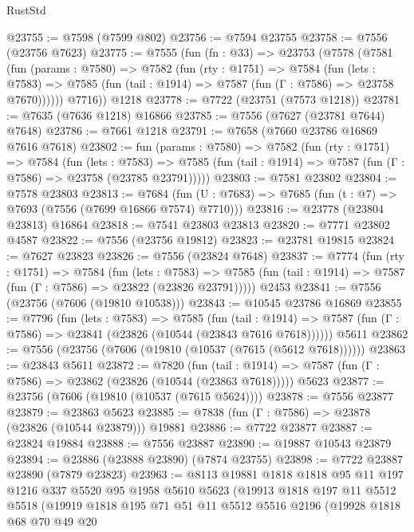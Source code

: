 \begin{lexlean}{RustStd}
\begin{coremodule}
{\begin{coremodule}
{{{{{{{{{{{{{{{{{{{{{{{{{{{{{{{{{{{{{{{{{{{@23755 := @7598 (@7599 @802)
@23756 := @7594 @23755
@23758 := @7556 (@23756 @7623)
@23775 := @7555
    (fun (fn : @33) =>
    @23753
      (@7578
        (@7581
          (fun (params : @7580) =>
          @7582
            (fun (rty : @1751) =>
            @7584
              (fun (lets : @7583) =>
              @7585 (fun (tail : @1914) => @7587 (fun (Γ : @7586) => @23758 @7670))))))
        @7716))
    @1218
@23778 := @7722 (@23751 (@7573 @1218))
@23781 := @7635 (@7636 @1218) @16866
@23785 := @7556 (@7627 (@23781 @7644) @7648)
@23786 := @7661 @1218
@23791 := @7658 (@7660 @23786 @16869 @7616 @7618)
@23802 := fun (params : @7580) =>
  @7582
    (fun (rty : @1751) =>
    @7584
      (fun (lets : @7583) =>
      @7585 (fun (tail : @1914) => @7587 (fun (Γ : @7586) => @23758 (@23785 @23791)))))
@23803 := @7581 @23802
@23804 := @7578 @23803
@23813 := @7684
    (fun (U : @7683) => @7685 (fun (t : @7) => @7693 (@7556 (@7699 @16866 @7574) @7710)))
@23816 := @23778 (@23804 @23813) @16864
@23818 := @7541 @23803 @23813
@23820 := @7771 @23802 @4587
@23822 := @7556 (@23756 @19812)
@23823 := @23781 @19815
@23824 := @7627 @23823
@23826 := @7556 (@23824 @7648)
@23837 := @7774
    (fun (rty : @1751) =>
    @7584
      (fun (lets : @7583) =>
      @7585 (fun (tail : @1914) => @7587 (fun (Γ : @7586) => @23822 (@23826 @23791)))))
    @2453
@23841 := @7556 (@23756 (@7606 (@19810 @10538)))
@23843 := @10545 @23786 @16869
@23855 := @7796
    (fun (lets : @7583) =>
    @7585
      (fun (tail : @1914) =>
      @7587 (fun (Γ : @7586) => @23841 (@23826 (@10544 (@23843 @7616 @7618))))))
    @5611
@23862 := @7556 (@23756 (@7606 (@19810 (@10537 (@7615 (@5612 @7618))))))
@23863 := @23843 @5611
@23872 := @7820
    (fun (tail : @1914) => @7587 (fun (Γ : @7586) => @23862 (@23826 (@10544 (@23863 @7618)))))
    @5623
@23877 := @23756 (@7606 (@19810 (@10537 (@7615 @5624))))
@23878 := @7556 @23877
@23879 := @23863 @5623
@23885 := @7838 (fun (Γ : @7586) => @23878 (@23826 (@10544 @23879))) @19881
@23886 := @7722 @23877
@23887 := @23824 @19884
@23888 := @7556 @23887
@23890 := @19887 @10543 @23879
@23894 := @23886 (@23888 @23890) (@7874 @23755)
@23898 := @7722 @23887 @23890 (@7879 @23823)
@23963 := @8113
    @19881
    @1818
    @1818
    @95
    @11
    @197
    @1216
    @337
    @5520
    @95
    @1958
    @5610
    @5623
    (@19913
      @1818
      @197
      @11
      @5512
      @5518
      (@19919
        @1818
        @195
        @71
        @51
        @11
        @5512
        @5516
        @2196
        (@19928
          @1818
          @68
          @70
          @49
          @20
}}}}}}}}}}}}}}}}}}}}}}}}}}}}}}}}}}}}}}}}}}}
\end{coremodule}}
\end{coremodule}
\end{lexlean}
